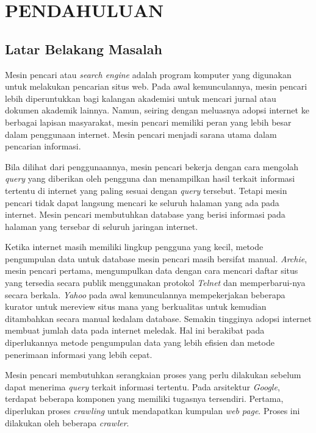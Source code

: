 
\chapter{PENDAHULUAN}

\section{Latar Belakang Masalah}

Mesin pencari atau \emph{search engine} adalah program komputer yang digunakan 
untuk melakukan pencarian situs web. Pada awal kemunculannya, mesin pencari
lebih diperuntukkan bagi kalangan akademisi untuk mencari jurnal atau dokumen
akademik lainnya. Namun, seiring dengan meluasnya adopsi internet ke berbagai
lapisan masyarakat, mesin pencari memiliki peran yang lebih besar dalam
penggunaan internet. Mesin pencari menjadi sarana utama dalam pencarian
informasi.

Bila dilihat dari penggunaannya, mesin pencari bekerja dengan cara mengolah
\emph{query} yang diberikan oleh pengguna dan menampilkan hasil terkait
informasi tertentu di internet yang paling sesuai dengan \emph{query} tersebut.
Tetapi mesin pencari tidak dapat langsung mencari ke seluruh halaman yang ada
pada internet. Mesin pencari membutuhkan database yang berisi informasi pada
halaman yang tersebar di seluruh jaringan internet. 

Ketika internet masih memiliki lingkup pengguna yang kecil, metode pengumpulan
data untuk database mesin pencari masih bersifat manual. \emph{Archie}, mesin
pencari pertama, mengumpulkan data dengan cara mencari daftar situs yang
tersedia secara publik menggunakan protokol \emph{Telnet} dan memperbarui-nya
secara berkala. \emph{Yahoo} pada awal kemunculannya mempekerjakan beberapa
kurator untuk mereview situs mana yang berkualitas untuk kemudian ditambahkan
secara manual kedalam database.  Semakin tingginya adopsi internet membuat
jumlah data pada internet meledak. Hal ini berakibat pada diperlukannya metode
pengumpulan data yang lebih efisien dan metode penerimaan informasi yang lebih
cepat.

Mesin pencari membutuhkan serangkaian proses yang perlu dilakukan sebelum dapat
menerima \emph{query} terkait informasi tertentu. Pada arsitektur \emph{Google},
terdapat beberapa komponen yang memiliki tugasnya tersendiri. Pertama,
diperlukan proses \emph{crawling} untuk mendapatkan kumpulan \emph{web page}.
Proses ini dilakukan oleh beberapa \emph{crawler}.

